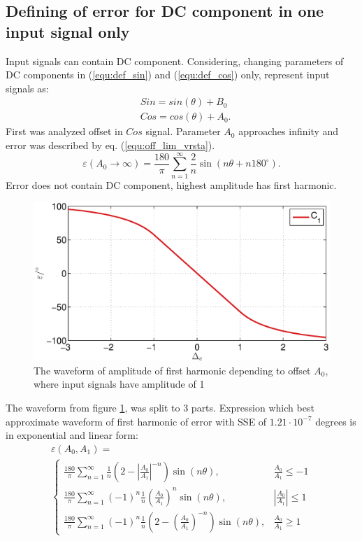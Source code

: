 \documentclass[a4paper]{article}
\begin{document}
\subsection{Defining of error for DC component in one input signal only}
\label{DCoff}
Input signals can contain DC component.
Considering, changing parameters of DC components in (\ref{equ:def_sin}) and (\ref{equ:def_cos}) only, represent input signals as:
\begin{eqnarray}
&Sin = sin(\theta)+ B_0\\
&Cos = cos(\theta) + A_0.
\end{eqnarray}
First was analyzed offset in $Cos$ signal. Parameter $A_0$ approaches infinity and error was described by eq. (\ref{equ:off_lim_vrsta}).
\begin{equation}
\label{equ:off_lim_vrsta}
\varepsilon (A_0 \rightarrow \infty) = \frac{180}{\pi}\sum_{n=1}^{\infty}\frac{2}{n} \sin (n \theta + n 180^\circ).
\end{equation}
Error does not contain DC component, highest amplitude has first harmonic.
\begin{figure}[!htb]
	\begin{center}
		\includegraphics[width=\linewidth]{./Slike/off.eps}
		\caption{The waveform of amplitude of first harmonic depending to offset  $A_0$, where input signals have amplitude of 1 } \label{fig:off}
	\end{center}
\end{figure}
The waveform from figure \ref{fig:off}, was split to 3 parts. Expression which best approximate waveform of first harmonic of error with SSE of $1.21 \cdot 10^{-7}$ degrees is in exponential and linear form:
\begin{multline}
\label{equ:offc_err}
\varepsilon(A_0, A_1)=\\
\begin{cases}
\frac{180}{\pi}\sum_{n=1}^{\infty} \frac{1}{n}(2-|\frac{A_0}{A_1}|^{-n}) \sin (n \theta ), & \frac{A_0}{A_1}\leq -1 \\
\frac{180}{\pi}\sum_{n=1}^{\infty}(-1)^n\frac{1}{n}(\frac{A_0}{A_1})^n \sin (n \theta ), & |\frac{A_0}{A_1}|\leq 1 \\
\frac{180}{\pi}\sum_{n=1}^{\infty}(-1)^n\frac{1}{n}(2-(\frac{A_0}{A_1})^{-n}) \sin (n \theta ), & \frac{A_0}{A_1}\geq 1
\end{cases}
\end{multline}
\end{document}
